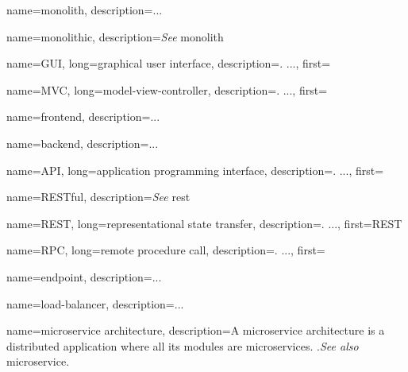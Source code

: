 




{
    name=monolith,
    description={...} %
}
    
{
    name=monolithic,
    description={\textit{See} \gls{monolith}}
}
    
{
    name=GUI,
    long={graphical user interface},
    description={. ...},%
    first=
}

{
    name=MVC,
    long={model-view-controller},
    description={. ...},
    first=
}

{
    name=frontend,
    description={...} %
}

{
    name=backend,
    description={...} %
}

{
    name=API,
    long={application programming interface},
    description={. ...},%
    first=
}

{
    name=RESTful,
    description={\textit{See} \gls{rest}}
}

{
    name=REST,
    long={representational state transfer},
    description={. ...},%
    first=REST %
}

{
    name=RPC,
    long={remote procedure call},
    description={. ...},%
    first= %
}

{
    name=endpoint,
    description={...} %
}

{
    name=load-balancer,
    description={...} %
}

{
    name=microservice architecture,
    description={A microservice architecture is a distributed application where
    all its modules are microservices. \autocite{Dragoni_etal_2017}.\textit{See
    also} \gls{microservice}.} %
}

